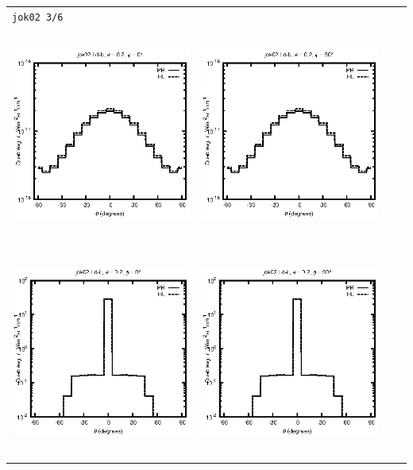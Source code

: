 \documentclass[10pt,a4paper]{article}
\begin{document}
\begin{adjustwidth}{-1.2in}{-1.2in}
\begin{tabular}{c c c c}
\multicolumn{4}{l}{\texttt{jok02 3/6}} \\
\includegraphics[height=7cm]{../eps/jok02_Ld_b_fwd.eps} &
\includegraphics[height=7cm]{../eps/jok02_Ld_b_cross.eps} \\
\includegraphics[height=7cm]{../eps/jok02_Ld_it_fwd.eps} &
\includegraphics[height=7cm]{../eps/jok02_Ld_it_cross.eps} \\

\end{tabular}
\end{adjustwidth}
\end{document}
